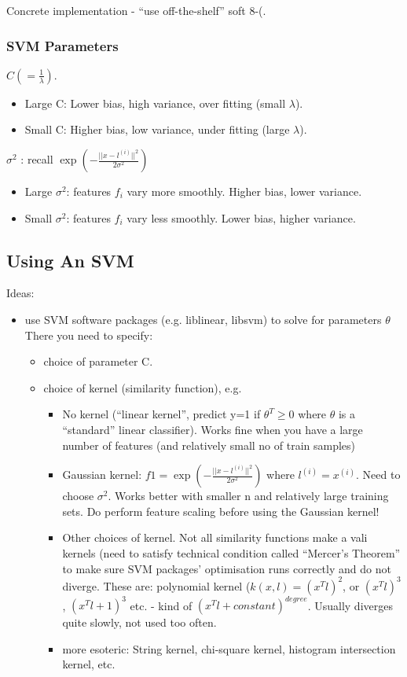 \documentclass{scrartcl}
\begin{document}
Concrete implementation - ``use off-the-shelf'' soft 8-(.

\subsubsection{SVM Parameters}
\label{sec:12-5-2}

$C ( = \frac{1}{\lambda})$.
\begin{itemize}
\item Large C: Lower bias, high variance, over fitting (small
  $\lambda$).
\item Small C: Higher bias, low variance, under fitting (large
  $\lambda$).
\end{itemize}

$\sigma^2$ : recall $\exp (-\frac{||x-l^{(i)}||^2}{2\sigma^2})$
\begin{itemize}
\item Large $\sigma^2$: features $f_i$ vary more smoothly. Higher
  bias, lower variance.
\item Small $\sigma^2$: features $f_i$ vary less smoothly. Lower bias,
  higher variance.
\end{itemize}

\subsection{Using An SVM}
\label{sec:12-6}
Ideas:
\begin{itemize}
\item use SVM software packages (e.g. liblinear, libsvm) to solve for
  parameters $\theta$ There you need to specify:
  \begin{itemize}
  \item choice of parameter C.
  \item choice of kernel (similarity function), e.g.
    \begin{itemize}
    \item No kernel (``linear kernel'', predict y=1 if $\theta^T \geq
      0$ where $\theta$ is a ``standard'' linear classifier). Works
      fine when you have a large number of features (and relatively
      small no of train samples)
    \item Gaussian kernel: $f1 = \exp(-\frac{||x-l^{(i)}||^2}{2
        \sigma^2})$ where $l^{(i)} = x^{(i)}$. Need to choose
      $\sigma^2$. Works better with smaller n and relatively large
      training sets. Do perform feature scaling before using the
      Gaussian kernel!
    \item Other choices of kernel. Not all similarity functions make a
      vali kernels (need to satisfy technical condition called
      ``Mercer's Theorem'' to make sure SVM packages' optimisation
      runs correctly and do not diverge. These are: polynomial kernel
      ($k(x, l) = (x^T l)^2$, or $(x^T l)^3$, $(x^T l + 1)^3$ etc. -
      kind of $(x^T l + constant)^{degree}$. Usually diverges quite
      slowly, not used too often.
    \item more esoteric: String kernel, chi-square kernel, histogram
      intersection kernel, etc.
    \end{itemize}
  \end{itemize}
\end{itemize}
\end{document}
